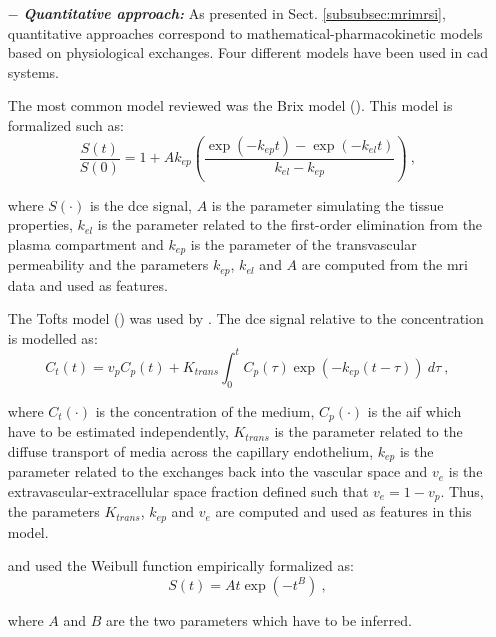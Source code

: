 \begin{enumerate}[leftmargin=*]
\item[$-$] \textbf{\textit{Quantitative approach:}} As presented in Sect. \ref{subsubsec:mrimrsi}, quantitative approaches correspond to mathematical-pharmacokinetic models based on physiological exchanges. Four different models have been used in \ac{cad} systems. 

The most common model reviewed was the Brix model (\cite{Artan2009,Artan2010,Sung2011,Liu2009,Ozer2009,Ozer2010}). This model is formalized such as:
\begin{equation}
	\frac{S(t)}{S(0)} = 1 + A k_{ep} \left( \frac{\exp( -k_{ep} t ) - \exp( -k_{el} t )}{k_{el} - k_{ep}} \right) \ ,
	\label{eq:brixmod}
\end{equation}

\noindent where $S(\cdot)$ is the \ac{dce} signal, $A$ is the parameter simulating the tissue properties, $k_{el}$ is the parameter related to the first-order elimination from the plasma compartment and $k_{ep}$ is the parameter of the transvascular permeability and the parameters $k_{ep}$, $k_{el}$ and $A$ are computed from the \ac{mri} data and used as features.

The Tofts model (\cite{Tofts1997}) was used by \cite{Langer2009,Giannini2013,Niaf2011,Niaf2012,Mazzetti2011}. The \ac{dce} signal relative to the concentration is modelled as:
\begin{equation}
	C_t(t) = v_p C_p(t) + K_{trans} \int_{0}^{t} C_p(\tau) \exp( -k_{ep}(t-\tau) ) \ d\tau \ ,
	\label{eq:tofts} 
\end{equation}

\noindent where $C_t(\cdot)$ is the concentration of the medium, $C_p(\cdot)$ is the \ac{aif} which have to be estimated independently, $K_{trans}$ is the parameter related to the diffuse transport of media across the capillary endothelium, $k_{ep}$ is the parameter related to the exchanges back into the vascular space and $v_e$ is the extravascular-extracellular space fraction defined such that $v_e = 1 - v_p$. Thus, the parameters $K_{trans}$, $k_{ep}$ and $v_e$ are computed and used as features in this model.

\cite{Mazzetti2011} and \cite{Giannini2013} used the Weibull function empirically formalized as:
\begin{equation}
	S(t) = A t \exp( -t^{B} ) \ ,
	\label{eq:weibull}
\end{equation}

\noindent where $A$ and $B$ are the two parameters which have to be inferred.


\end{enumerate}

